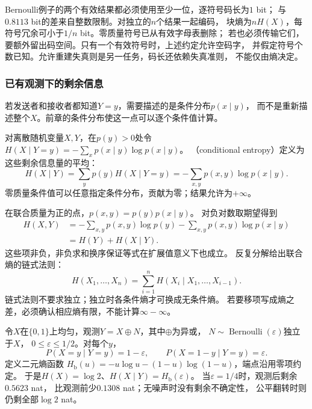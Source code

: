 Bernoulli例子的两个有效结果都必须使用至少一位，逐符号码长为\(1\) bit；
与\(0.8113\) bit的差来自整数限制。对独立的\(n\)个结果一起编码，
块熵为\(nH(X)\)，每符号冗余可小于\(1/n\) bit。零质量符号已从有效字母表删除；
若也必须传输它们，要额外留出码空间。只有一个有效符号时，上述约定允许空码字，
并假定符号个数已知。允许重建失真则是另一任务，码长还依赖失真准则，
不能仅由熵决定。

\subsubsection{已有观测下的剩余信息}
\label{sec:information-remaining-information}

若发送者和接收者都知道\(Y=y\)，需要描述的是条件分布\(p(x\mid y)\)，
而不是重新描述整个\(X\)。前章的条件分布使这一点可以逐个条件值计算。

\begin{definition}[离散条件熵]
\label{def:information-conditional-entropy}
对离散随机变量\(X,Y\)，在\(p(y)>0\)处令
\(H(X\mid Y=y)=-\sum_xp(x\mid y)\log p(x\mid y)\)。
（conditional entropy）定义为这些剩余信息量的平均：
\begin{equation}
  H(X\mid Y)=\sum_yp(y)H(X\mid Y=y)
           =-\sum_{x,y}p(x,y)\log p(x\mid y).
  \label{eq:information-conditional-entropy}
\end{equation}
零质量条件值可以任意指定条件分布，贡献为零；结果允许为\(+\infty\)。
\end{definition}

在联合质量为正的点，\(p(x,y)=p(y)p(x\mid y)\)。
对负对数取期望得到
\[
\begin{aligned}
  H(X,Y)
  &=-\sum_{x,y}p(x,y)\log p(y)
    -\sum_{x,y}p(x,y)\log p(x\mid y)\\
  &=H(Y)+H(X\mid Y).
\end{aligned}
\]
这些项非负，非负求和换序保证等式在扩展值意义下也成立。
反复分解给出联合熵的链式法则：
\begin{equation}
  H(X_1,\ldots,X_n)
  =\sum_{i=1}^nH(X_i\mid X_1,\ldots,X_{i-1}).
  \label{eq:information-entropy-chain-rule}
\end{equation}
链式法则不要求独立；独立时各条件熵才可换成无条件熵。
若要移项写成熵之差，必须确认相应熵有限，不能计算\(\infty-\infty\)。

\begin{example}[一次带噪二元观测]
\label{ex:information-binary-channel}
令\(X\)在\(\{0,1\}\)上均匀，观测\(Y=X\oplus N\)，其中\(\oplus\)为异或，
\(N\sim\operatorname{Bernoulli}(\varepsilon)\)独立于\(X\)，
\(0\leq\varepsilon\leq1/2\)。对每个\(y\)，
\[
  P(X=y\mid Y=y)=1-\varepsilon,\qquad
  P(X=1-y\mid Y=y)=\varepsilon.
\]
定义二元熵函数
\(H_{\mathrm b}(u)=-u\log u-(1-u)\log(1-u)\)，端点沿用零项约定。
于是\(H(X)=\log2\)、\(H(X\mid Y)=H_{\mathrm b}(\varepsilon)\)。
当\(\varepsilon=1/4\)时，观测后剩余\(0.5623\) nat，
比观测前少\(0.1308\) nat；无噪声时没有剩余不确定性，
公平翻转时则仍剩全部\(\log2\) nat。
\end{example}

